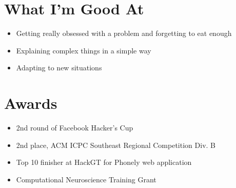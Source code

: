 \documentclass[letterpaper]{deedy-resume} %
\begin{document}
\begin{minipage}[t]{0.66\textwidth}
\sectionspace %

\section{What I'm Good At}

\begin{itemize}
	\item{Getting really obsessed with a problem and forgetting to eat enough}
	\item{Explaining complex things in a simple way}
	\item{Adapting to new situations}
\end{itemize}

\sectionspace %

\section{Awards}

\begin{itemize}
	\item{2nd round of Facebook Hacker's Cup}
	\item{2nd place, ACM ICPC Southeast Regional Competition Div. B}
	\item{Top 10 finisher at HackGT for Phonely web application}
	\item{Computational Neuroscience Training Grant}
\end{itemize}

\end{minipage} %








\end{document}

